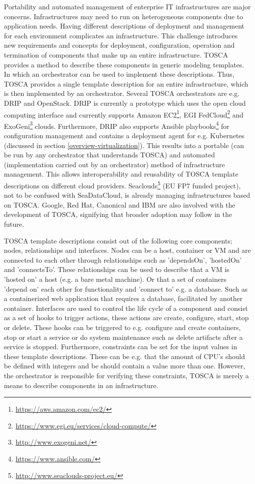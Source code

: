 Portability and automated management of enterprise IT infrastructures are major concerns. Infrastructures may need to run on heterogeneous components due to application needs. Having different descriptions of deployment and management for each environment complicates an infrastructure. This challenge introduces new requirements and concepts for deployment, configuration, operation and termination of components that make up an entire infrastructure. TOSCA provides a method to describe these components in generic modeling templates. In which an orchestrator can be used to implement these descriptions. Thus, TOSCA provides a single template description for an entire infrastructure, which is then implemented by an orchestrator. Several TOSCA orchestrators are e.g. DRIP and OpenStack. DRIP is currently a prototype which uses the open cloud computing interface and currently supports Amazon EC2\footnote{\url{https://aws.amazon.com/ec2/}}, EGI FedCloud\footnote{\url{https://www.egi.eu/services/cloud-compute/}} and ExoGeni\footnote{\url{http://www.exogeni.net/}} clouds. Furthermore, DRIP also supports Ansible playbooks\footnote{\url{https://www.ansible.com/}} for configuration management and contains a deployment agent for e.g. Kubernetes (discussed in section \ref{overview-virtualization}). This results into a portable (can be run by any orchestrator that understands TOSCA) and automated (implementation carried out by an orchestrator) method of infrastructure management. This allows interoperability and reusability of TOSCA template descriptions on different cloud providers. Seaclouds\footnote{\url{http://www.seaclouds-project.eu/}} (EU FP7 funded project), not to be confused with SeaDataCloud, is already managing infrastructures based on TOSCA. Google, Red Hat, Canonical and IBM are also involved with the development of TOSCA, signifying that broader adoption may follow in the future.

TOSCA template descriptions consist out of the following core components; nodes, relationships and interfaces. Nodes can be a host, container or VM and are connected to each other through relationships such as 'dependsOn', 'hostedOn' and 'connectsTo'. These relationships can be used to describe that a VM is 'hosted on' a host (e.g. a bare metal machine). Or that a set of containers 'depend on' each other for functionality and 'connect to' e.g. a database. Such as a containerized web application that requires a database, facilitated by another container. Interfaces are used to control the life cycle of a component and consist as a set of hooks to trigger actions, these actions are create, configure, start, stop or delete. These hooks can be triggered to e.g. configure and create containers, stop or start a service or do system maintenance such as delete artifacts after a service is stopped. Furthermore, constraints can be set for the input values in these template descriptions. These can be e.g. that the amount of CPU's should be defined with integers and be should contain a value more than one. However, the orchestrator is responsible for verifying these constraints, TOSCA is merely a means to describe components in an infrastructure. 

